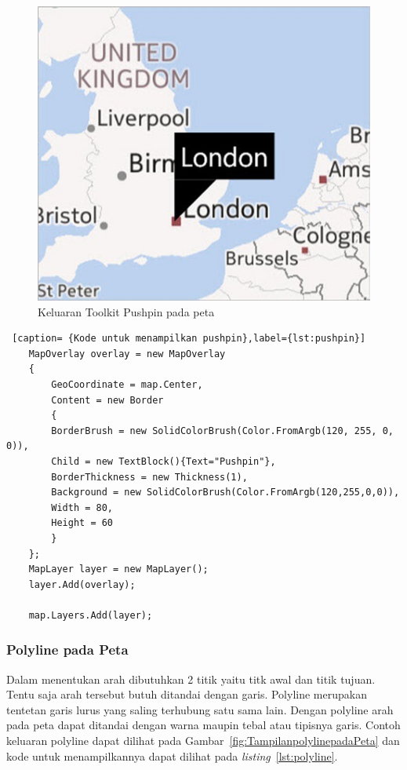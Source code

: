\begin{figure}[h]
	\centering
		\includegraphics[scale=0.5]{Gambar/toolkit_pushpin}
	\caption{Keluaran Toolkit Pushpin pada peta \cite{Manning}}
	\label{fig:toolkit_pushpin}
\end{figure}

\begin{lstlisting} [caption= {Kode untuk menampilkan pushpin},label={lst:pushpin}]
	MapOverlay overlay = new MapOverlay
	{
		GeoCoordinate = map.Center,
		Content = new Border
		{
		BorderBrush = new SolidColorBrush(Color.FromArgb(120, 255, 0, 0)),
		Child = new TextBlock(){Text="Pushpin"},
		BorderThickness = new Thickness(1),
		Background = new SolidColorBrush(Color.FromArgb(120,255,0,0)),
		Width = 80,
		Height = 60
		}
	};
	MapLayer layer = new MapLayer();
	layer.Add(overlay);

	map.Layers.Add(layer);
\end{lstlisting}

\subsubsection{Polyline pada Peta}
\label{subsubsec:Polyline pada Peta}
\hspace{0.5cm} Dalam menentukan arah dibutuhkan 2 titik yaitu titk awal dan titik tujuan. Tentu saja arah tersebut butuh ditandai dengan garis. Polyline merupakan tentetan garis lurus yang saling terhubung satu sama lain. Dengan polyline arah pada peta dapat ditandai dengan warna maupin tebal atau tipisnya garis. Contoh keluaran polyline dapat dilihat pada Gambar~\ref{fig:TampilanpolylinepadaPeta} dan kode untuk menampilkannya dapat dilihat pada \textit{listing}~\ref{lst:polyline}.


